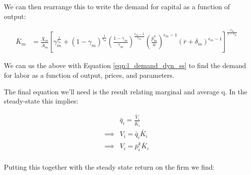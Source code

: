 \documentclass[letterpaper,12pt]{article}
\theoremstyle{definition}
\begin{document}
\begin{spacing}{1.5}
We can then rearrange this to write the demand for capital as a function of output:

\begin{equation}
\begin{split}
\label{eqn:k_demand_dyn_ss}
\bar{K}_{m} &= \frac{\bar{X}_{m}}{\bar{A}_{m}}\left[\gamma_{m}^{\frac{1}{\epsilon_{m}}} + (1-\gamma_{m})^{\frac{1}{\epsilon_{m}}} \left(\frac{1-\gamma_{m}}{\gamma_{m}}\right)^{\frac{\epsilon_{m}-1}{\epsilon_{m}}} \left(\frac{\bar{p}^{k}_{m}}{\bar{w}} \right)^{\epsilon_{m}-1}\left( \bar{r}+\delta_{m}\right)^{\epsilon_{m}-1}  \right]^{\frac{\epsilon_{m}}{1-\epsilon_{m}}}
\end{split}
\end{equation}

We can us the above with Equation \ref{eqn:l_demand_dyn_ss} to find the demand for labor as a function of output, prices, and parameters.



The final equation we'll need is the \citet{Hayashi1982} result relating marginal and average q.  In the steady-state this implies:

\begin{equation}
\label{eqn:ss_marg_avg_q}
\begin{split}
& \bar{q}_{i} = \frac{\bar{V}_{i}}{\bar{K}_{i}} \\
\implies & V_{i} = \bar{q}_{i}\bar{K}_{i} \\
\implies & V_{i} = \bar{p}^{k}_{i}\bar{K}_{i}  \\
\end{split}
\end{equation}

Putting this together with the steady state return on the firm we find:


\end{spacing}
\end{document}
